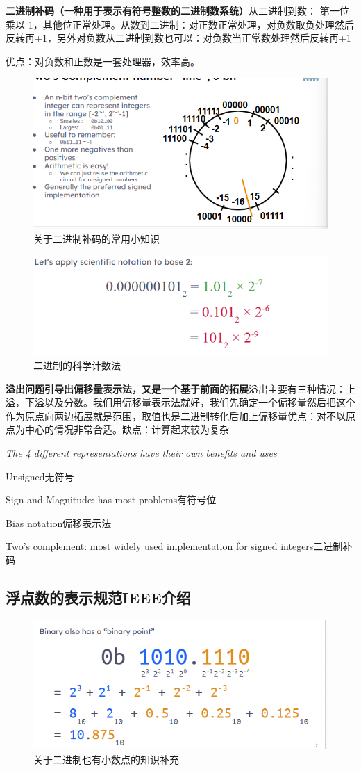 \documentclass{ctexart}
\begin{document}
\textbf{二进制补码（一种用于表示有符号整数的二进制数系统）}从二进制到数：
第一位乘以-1，其他位正常处理。从数到二进制：对正数正常处理，对负数取负处理然后反转再+1，另外对负数从二进制到数也可以：对负数当正常数处理然后反转再+1
\par 优点：对负数和正数是一套处理器，效率高。\par
\begin{figure}
    \centering
    \includegraphics[width=0.5\linewidth]{about two completion you need to know.png}
    \caption{关于二进制补码的常用小知识}
    \label{fig:enter-label}
\end{figure}
\begin{figure}
    \centering
    \includegraphics[width=0.5\linewidth]{二进制的科学计数法.png}
    \caption{二进制的科学计数法}
    \label{fig:enter-label}
\end{figure}
\textbf{溢出问题引导出偏移量表示法，又是一个基于前面的拓展}溢出主要有三种情况：上溢，下溢以及分数。我们用偏移量表示法就好，我们先确定一个偏移量然后把这个作为原点向两边拓展就是范围，取值也是二进制转化后加上偏移量优点：对不以原点为中心的情况非常合适。缺点：计算起来较为复杂\par
\textit{The 4 different representations have their own benefits and uses}\par
Unsigned无符号\par
Sign and Magnitude: has most problems有符号位\par
Bias notation偏移表示法\par
Two’s complement: most widely used implementation for signed integers二进制补码\par
\subsection{浮点数的表示规范IEEE介绍}
\begin{figure}
    \centering
    \includegraphics[width=0.25\linewidth]{image.png}
    \caption{关于二进制也有小数点的知识补充}
    \label{fig:enter-label}
\end{figure}
\end{document}

